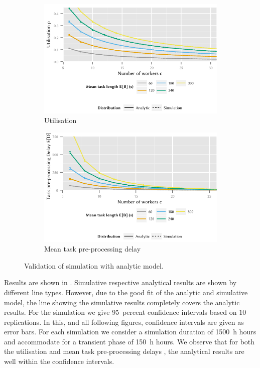 \begin{figure}
	\centering
	\begin{subfigure}{\columnwidth}
		\includegraphics{cloud/crowdsourcing/model/figures/comparison_utilization}
		\caption{Utilisation \workerUtilization}
		\label{fig:cloud:crowdsourcing:validation:model:utilization}
	\end{subfigure}

	\begin{subfigure}{\columnwidth}
		\includegraphics{cloud/crowdsourcing/model/figures/comparison_task_delay}
		\caption{Mean task pre-processing delay \preTaskProcessingDelay}
		\label{fig:cloud:crowdsourcing:validation:model:task_delay}
	\end{subfigure}
	\caption{Validation of simulation with analytic model.}
	\label{fig:cloud:crowdsourcing:validation:model}
\end{figure}

Results are shown in .
Simulative respective analytical results are shown by different line types.
However, due to the good fit of the analytic and simulative model, the line showing the simulative results completely covers the analytic results.
For the simulation we give \SI{95}{percent} confidence intervals based on \(10\) replications.
In this, and all following figures, confidence intervals are given as error bars.
For each simulation we consider a simulation duration of \SI{1500}{\hour} hours and accommodate for a transient phase of \SI{150}{\hour} hours.
We observe that for both the utilisation \workerUtilization and mean task pre-processing delays \preTaskProcessingDelay, the analytical results are well within the confidence intervals.
